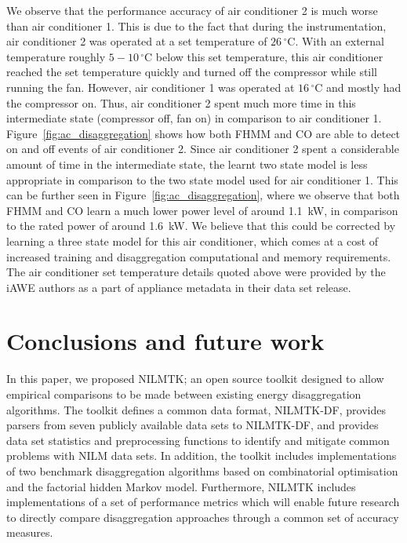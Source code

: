 \documentclass{sig-alternate}
\newcommand{\figref}[1]{Figure~\ref{#1}}
\begin{document}
We observe that the performance accuracy of air conditioner 2 is much worse than air conditioner 1. This is due to the fact that during the instrumentation, air conditioner 2 was operated at a set temperature of $26\,^{\circ}\mathrm{C}$. With an external temperature roughly $5-10\,^{\circ}\mathrm{C}$ below this set temperature, this air conditioner reached the set temperature quickly and turned off the compressor while still running the fan. However, air conditioner 1 was operated at $16\,^{\circ}\mathrm{C}$ and mostly had the compressor on. Thus, air conditioner 2 spent much more time in this intermediate state (compressor off, fan on) in comparison to air conditioner 1. \figref{fig:ac_disaggregation} shows how both FHMM and CO are able to detect on and off events of air conditioner 2. Since air conditioner 2 spent a considerable amount of time in the intermediate state, the learnt two state model is less appropriate in comparison to the two state model used for air conditioner 1. This can be further seen in \figref{fig:ac_disaggregation}, where we observe that both FHMM and CO learn a much lower power level of around 1.1~kW, in comparison to the rated power of around 1.6~kW. We believe that this could be corrected by learning a three state model for this air conditioner, which comes at a cost of increased training and disaggregation computational and memory requirements. The air conditioner set temperature details quoted above were provided by the iAWE authors as a part of appliance metadata in their data set release.



\section{Conclusions and future work}
\label{sec:conclusions}

\noindent
In this paper, we proposed NILMTK; an open source toolkit designed to allow empirical comparisons to be made between existing energy disaggregation algorithms. The toolkit defines a common data format, NILMTK-DF, provides parsers from seven publicly available data sets to NILMTK-DF, and provides data set statistics and preprocessing functions to identify and mitigate common problems with NILM data sets. In addition, the toolkit includes implementations of two benchmark disaggregation algorithms based on combinatorial optimisation and the factorial hidden Markov model. Furthermore, NILMTK includes implementations of a set of performance metrics which will enable future research to directly compare disaggregation approaches through a common set of accuracy measures.
\end{document}
